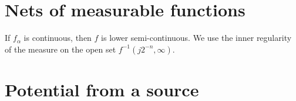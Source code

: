 \documentclass[a4paper]{article}
\begin{document}
\tableofcontents
\newpage

\section{Nets of measurable functions}
\begin{prb}
\begin{parts}
\item 
\end{parts}
\end{prb}
If $f_\alpha$ is continuous, then $f$ is lower semi-continuous.
We use the inner regularity of the measure on the open set $f^{-1}(j2^{-n},\infty)$.

\newpage

\section{Potential from a source}
\end{document}
